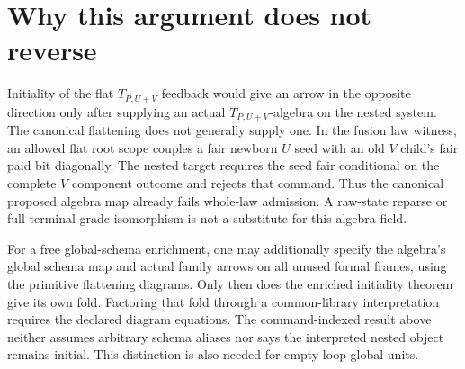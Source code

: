 \documentclass[11pt]{article}\usepackage{amsmath,amssymb,amsthm,geometry}\geometry{margin=1in}\newtheorem{lemma}{Lemma}\newtheorem{theorem}[lemma]{Theorem}
\begin{document}
\section{Why this argument does not reverse}
Initiality of the flat $T_{P,U+V}$ feedback would give an arrow in the opposite direction only after supplying an actual $T_{P,U+V}$-algebra on the nested system. The canonical flattening does not generally supply one. In the fusion law witness, an allowed flat root scope couples a fair newborn $U$ seed with an old $V$ child's fair paid bit diagonally. The nested target requires the seed fair conditional on the complete $V$ component outcome and rejects that command. Thus the canonical proposed algebra map already fails whole-law admission. A raw-state reparse or full terminal-grade isomorphism is not a substitute for this algebra field.

For a free global-schema enrichment, one may additionally specify the algebra's global schema map and actual family arrows on all unused formal frames, using the primitive flattening diagrams. Only then does the enriched initiality theorem give its own fold. Factoring that fold through a common-library interpretation requires the declared diagram equations. The command-indexed result above neither assumes arbitrary schema aliases nor says the interpreted nested object remains initial. This distinction is also needed for empty-loop global units.
\end{document}
